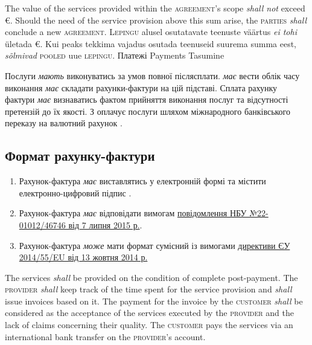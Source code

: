 \begin{Form}
\begin{paracol}{3}
        {The value of the services provided within the \textsc{agreement}'s scope \textit{shall not} exceed  €. Should the need of the service provision above this sum arise, the \textsc{parties} \textit{shall} conclude a new \textsc{agreement}.}
        {L\textsc{epingu} alusel osutatavate teenuste väärtus \emph{ei tohi} ületada  €. Kui peaks tekkima vajadus osutada teenuseid suurema summa eest, \emph{sõlmivad} \textsc{pooled} uue \textsc{lepingu}.}
      \clause %
        {Платежі}
        {Payments}
        {Tasumine}
        {\label{sec:payment}Послуги \textit{мають} виконуватись за умов повної післясплати.  \textit{має} вести облік часу виконання \textit{має} складати рахунки-фактури на цій підставі. Сплата  рахунку фактури \textit{має} визнаватись фактом прийняття виконання  послуг  та відсутності претензій до їх якості. З оплачує послуги шляхом міжнародного банківського переказу на валютний рахунок .

        \subsection{Формат рахунку-фактури}
        \begin{enumerate}
          \item Рахунок-фактура \textit{має} виставлятись у електронній формі та містити електронно-цифровий підпис .
          \item Рахунок-фактура \textit{має} відповідати вимогам \href{http://bank.gov.ua/doccatalog/document?id=19208488}{повідомлення НБУ №22-01012/46746 від 7 липня 2015 р.}.
          \item Рахунок-фактура \textit{може} мати формат сумісний із вимогами \href{http://eur-lex.europa.eu/legal-content/EN/TXT/?uri=CELEX:32014L0055}{директиви ЄУ 2014/55/EU від 13 жовтня 2014 р.}
        \end{enumerate}
        }
        {The services \textit{shall} be provided on the condition of complete post-payment. The \textsc{provider} \textit{shall} keep track of the time spent for the service provision and \textit{shall} issue invoices based on it. The payment for the invoice by the \textsc{customer} \textit{shall} be considered as the acceptance of the services executed by the \textsc{provider} and the lack of claims concerning their quality. The \textsc{customer} pays the services via an international bank transfer on the \textsc{provider}'s account.

}
\end{paracol}
\end{Form}
